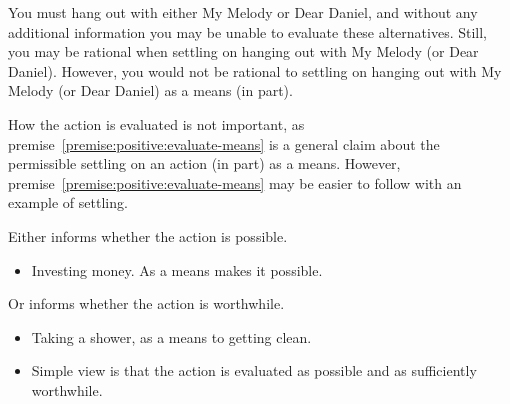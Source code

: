 \documentclass[10pt]{article}
\newcommand{\hozlinedash}[0]{%
  \noindent\hdashrule[0.5ex][c]{\textwidth}{.1pt}{2.5pt}
}
\begin{document}
\begin{example}
  You must hang out with either My Melody or Dear Daniel, and without any additional information you may be unable to evaluate these alternatives.
  Still, you may be rational when settling on hanging out with My Melody (or Dear Daniel).
  However, you would not be rational to settling on hanging out with My Melody (or Dear Daniel) as a means (in part).
\end{example}



\hozlinedash

How the action is evaluated is not important, as premise~\ref{premise:positive:evaluate-means} is a general claim about the permissible settling on an action (in part) as a means.
However, premise~\ref{premise:positive:evaluate-means} may be easier to follow with an example of settling.

Either informs whether the action is possible.
\begin{itemize}
\item Investing money.
  As a means makes it possible.
\end{itemize}
Or informs whether the action is worthwhile.
\begin{itemize}
\item Taking a shower, as a means to getting clean.
\end{itemize}


 \begin{itemize}
  \item Simple view is that the action is evaluated as possible and as sufficiently worthwhile.
  \end{itemize}
\end{document}
